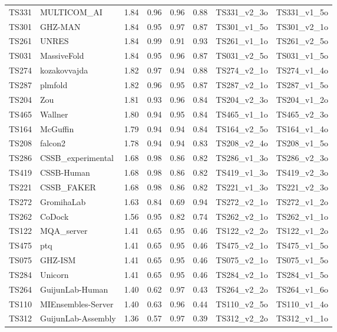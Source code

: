 \begin{longtable}{llllllll}
TS331 & MULTICOM\_AI & 1.84 & 0.96 & 0.96 & 0.88 & TS331\_v2\_3o & TS331\_v1\_5o \\ 
TS301 & GHZ-MAN & 1.84 & 0.95 & 0.97 & 0.87 & TS301\_v1\_5o & TS301\_v2\_1o \\ 
TS261 & UNRES & 1.84 & 0.99 & 0.91 & 0.93 & TS261\_v1\_1o & TS261\_v2\_5o \\ 
TS031 & MassiveFold & 1.84 & 0.95 & 0.96 & 0.87 & TS031\_v2\_5o & TS031\_v1\_5o \\ 
TS274 & kozakovvajda & 1.82 & 0.97 & 0.94 & 0.88 & TS274\_v2\_1o & TS274\_v1\_4o \\ 
TS287 & plmfold & 1.82 & 0.96 & 0.95 & 0.87 & TS287\_v2\_1o & TS287\_v1\_5o \\ 
TS204 & Zou & 1.81 & 0.93 & 0.96 & 0.84 & TS204\_v2\_3o & TS204\_v1\_2o \\ 
TS465 & Wallner & 1.80 & 0.94 & 0.95 & 0.84 & TS465\_v1\_1o & TS465\_v2\_3o \\ 
TS164 & McGuffin & 1.79 & 0.94 & 0.94 & 0.84 & TS164\_v2\_5o & TS164\_v1\_4o \\ 
TS208 & falcon2 & 1.78 & 0.94 & 0.94 & 0.83 & TS208\_v2\_4o & TS208\_v1\_5o \\ 
TS286 & CSSB\_experimental & 1.68 & 0.98 & 0.86 & 0.82 & TS286\_v1\_3o & TS286\_v2\_3o \\ 
TS419 & CSSB-Human & 1.68 & 0.98 & 0.86 & 0.82 & TS419\_v1\_3o & TS419\_v2\_3o \\ 
TS221 & CSSB\_FAKER & 1.68 & 0.98 & 0.86 & 0.82 & TS221\_v1\_3o & TS221\_v2\_3o \\ 
TS272 & GromihaLab & 1.63 & 0.84 & 0.69 & 0.94 & TS272\_v2\_1o & TS272\_v1\_2o \\ 
TS262 & CoDock & 1.56 & 0.95 & 0.82 & 0.74 & TS262\_v2\_1o & TS262\_v1\_1o \\ 
TS122 & MQA\_server & 1.41 & 0.65 & 0.95 & 0.46 & TS122\_v2\_2o & TS122\_v1\_2o \\ 
TS475 & ptq & 1.41 & 0.65 & 0.95 & 0.46 & TS475\_v2\_1o & TS475\_v1\_5o \\ 
TS075 & GHZ-ISM & 1.41 & 0.65 & 0.95 & 0.46 & TS075\_v2\_1o & TS075\_v1\_5o \\ 
TS284 & Unicorn & 1.41 & 0.65 & 0.95 & 0.46 & TS284\_v2\_1o & TS284\_v1\_5o \\ 
TS264 & GuijunLab-Human & 1.40 & 0.62 & 0.97 & 0.43 & TS264\_v2\_2o & TS264\_v1\_6o \\ 
TS110 & MIEnsembles-Server & 1.40 & 0.63 & 0.96 & 0.44 & TS110\_v2\_5o & TS110\_v1\_4o \\ 
TS312 & GuijunLab-Assembly & 1.36 & 0.57 & 0.97 & 0.39 & TS312\_v2\_2o & TS312\_v1\_1o \\ 

\end{longtable}
